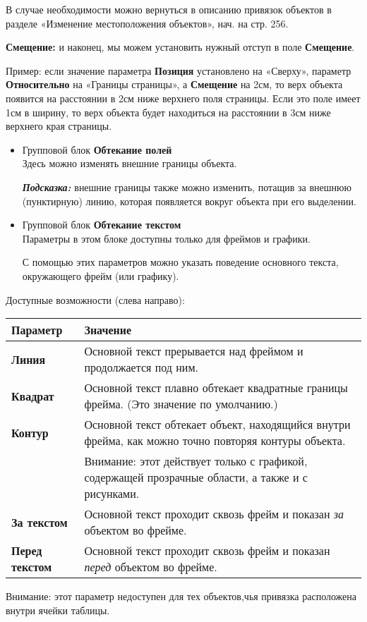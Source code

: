 \documentclass[a4paper,10pt]{article}
\begin{document}
В случае необходимости можно вернуться в описанию привязок объектов в разделе «Изменение местоположения объектов», нач. на стр. 256.

\textbf{Смещение:} и наконец, мы можем установить нужный отступ в поле \textbf{Смещение}.

Пример: если значение параметра \textbf{Позиция} установлено на «Сверху», параметр \textbf{Относительно} на «Границы страницы», а \textbf{Смещение} на 2см, то верх объекта появится на расстоянии в 2см ниже верхнего поля страницы. Если это поле имеет 1см в ширину, то верх объекта будет находиться на расстоянии в 3см ниже верхнего края страницы.

\begin{itemize}
 \item Групповой блок \textbf{Обтекание полей}\\
 Здесь можно изменять внешние границы объекта.
 
 \textbf{\textit{Подсказка:}} внешние границы также можно изменить, потащив за внешнюю (пунктирную) линию, которая появляется вокруг объекта при его выделении.
 \item Групповой блок \textbf{Обтекание текстом}\\
 Параметры в этом блоке доступны только для фреймов и графики.
 
 С помощью этих параметров можно указать поведение основного текста, окружающего фрейм (или графику).
\end{itemize}

Доступные возможности (слева направо):

\begin{center}
\begin{tabular}{  m{4cm}  m{12cm}  }
 \textbf{Параметр} & \textbf{Значение}\\ 
 \hline
  \textbf{Линия} & Основной текст прерывается над фреймом и продолжается под ним.\\
  \textbf{Квадрат} & Основной текст плавно обтекает квадратные границы фрейма. (Это значение по умолчанию.)\\ 
\textbf{Контур} & Основной текст обтекает объект, находящийся внутри фрейма, как можно точно повторяя контуры объекта.\\
 & Внимание: этот действует только с графикой, содержащей прозрачные области, а также и с рисунками.\\
\textbf{За текстом} & Основной текст проходит сквозь фрейм и показан \textit{за} объектом во фрейме.\\
\textbf{Перед текстом} & Основной текст проходит сквозь фрейм и показан \textit{перед} объектом во фрейме.\\
\end{tabular}
\end{center}
 Внимание: этот параметр недоступен для тех объектов,чья привязка расположена внутри ячейки таблицы.
 
\end{document}

